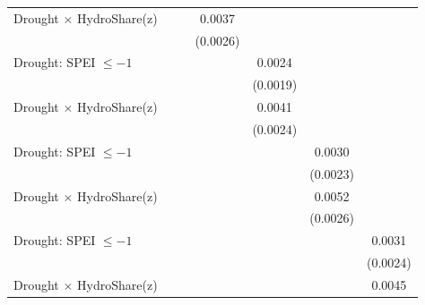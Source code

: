 {\begin{tabular}{l*{6}{c}}
\addlinespace
Drought $\times$ HydroShare(z)&                     &                     &      0.0037         &                     &                     &                     \\
                    &                     &                     &    (0.0026)         &                     &                     &                     \\
\addlinespace
Drought: SPEI $\leq -1$&                     &                     &                     &      0.0024         &                     &                     \\
                    &                     &                     &                     &    (0.0019)         &                     &                     \\
\addlinespace
Drought $\times$ HydroShare(z)&                     &                     &                     &      0.0041\sym{*}  &                     &                     \\
                    &                     &                     &                     &    (0.0024)         &                     &                     \\
\addlinespace
Drought: SPEI $\leq -1$&                     &                     &                     &                     &      0.0030         &                     \\
                    &                     &                     &                     &                     &    (0.0023)         &                     \\
\addlinespace
Drought $\times$ HydroShare(z)&                     &                     &                     &                     &      0.0052\sym{*}  &                     \\
                    &                     &                     &                     &                     &    (0.0026)         &                     \\
\addlinespace
Drought: SPEI $\leq -1$&                     &                     &                     &                     &                     &      0.0031         \\
                    &                     &                     &                     &                     &                     &    (0.0024)         \\
\addlinespace
Drought $\times$ HydroShare(z)&                     &                     &                     &                     &                     &      0.0045         \\

\end{tabular}}
